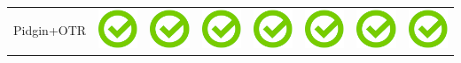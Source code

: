 \documentclass[10pt,foldmark,tumble]{leaflet}
\begin{document}
\begin{center}
{{\begin{tabular}{ L{2cm} | C{2cm} | C{2cm} | C{2cm} | C{2cm} | C{2cm} | C{2cm} | C{2cm} }
Pidgin+OTR & \includegraphics[scale=0.1]{pics/haken.png} & \includegraphics[scale=0.1]{pics/haken.png} & \includegraphics[scale=0.1]{pics/haken.png} & \includegraphics[scale=0.1]{pics/haken.png} & \includegraphics[scale=0.1]{pics/haken.png} & \includegraphics[scale=0.1]{pics/haken.png} & \includegraphics[scale=0.1]{pics/haken.png} \tabularnewline

\end{tabular}}}
\end{center}
\end{document}
